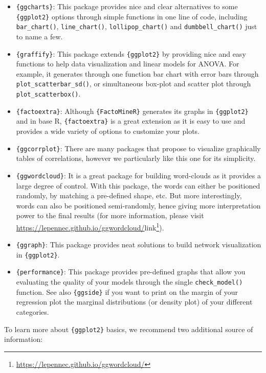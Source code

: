 \documentclass[
]{krantz}
\providecommand{\tightlist}{%
  \setlength{\itemsep}{0pt}\setlength{\parskip}{0pt}}
\renewcommand{\href}[2]{#2\footnote{\url{#1}}}
\begin{document}
\begin{itemize}
\tightlist
\item
  \texttt{\{ggcharts\}}: This package provides nice and clear alternatives to some \texttt{\{ggplot2\}} options through simple functions in one line of code, including \texttt{bar\_chart()}, \texttt{line\_chart()}, \texttt{lollipop\_chart()} and \texttt{dumbbell\_chart()} just to name a few.
\item
  \texttt{\{graffify\}}: This package extends \texttt{\{ggplot2\}} by providing nice and easy functions to help data visualization and linear models for ANOVA. For example, it generates through one function bar chart with error bars through \texttt{plot\_scatterbar\_sd()}, or simultaneous box-plot and scatter plot through \texttt{plot\_scatterbox()}.
\item
  \texttt{\{factoextra\}}: Although \texttt{\{FactoMineR\}} generates its graphs in \texttt{\{ggplot2\}} and in base R, \texttt{\{factoextra\}} is a great extension as it is easy to use and provides a wide variety of options to customize your plots.
\item
  \texttt{\{ggcorrplot\}}: There are many packages that propose to visualize graphically tables of correlations, however we particularly like this one for its simplicity.
\item
  \texttt{\{ggwordcloud\}}: It is a great package for building word-clouds as it provides a large degree of control. With this package, the words can either be positioned randomly, by matching a pre-defined shape, etc. But more interestingly, words can also be positioned semi-randomly, hence giving more interpretation power to the final results (for more information, please visit \url{https://lepennec.github.io/ggwordcloud/}\href{https://lepennec.github.io/ggwordcloud/}{link}).
\item
  \texttt{\{ggraph\}}: This package provides neat solutions to build network visualization in \texttt{\{ggplot2\}}.
\item
  \texttt{\{performance\}}: This package provides pre-defined graphs that allow you evaluating the quality of your models through the single \texttt{check\_model()} function. See also \texttt{\{ggside\}} if you want to print on the margin of your regression plot the marginal distributions (or density plot) of your different categories.
\end{itemize}

To learn more about \texttt{\{ggplot2\}} basics, we recommend two additional source of information:
\end{document}
